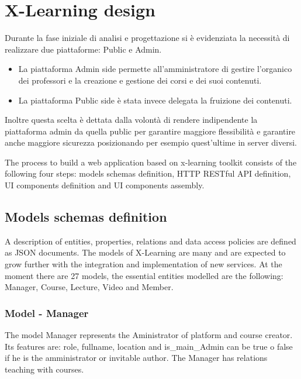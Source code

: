 \section{X-Learning design}
\label{sec:x-learning_design}

Durante la fase iniziale di analisi e progettazione si è evidenziata la necessità di realizzare due piattaforme: Public e Admin. 
\begin{itemize}
\item La piattaforma Admin side permette all'amministratore di gestire l'organico dei professori e la creazione e gestione dei corsi e dei suoi contenuti.
\item La piattaforma Public side è stata invece delegata la fruizione dei contenuti.
\end{itemize}

Inoltre questa scelta è dettata dalla volontà di rendere indipendente la piattaforma admin da quella public per garantire maggiore flessibilità e garantire anche maggiore sicurezza posizionando per esempio quest'ultime in server diversi.


The process to build a web application based on x-learning toolkit consists of the following four steps: models schemas definition, HTTP RESTful API definition, UI components definition and UI components  assembly.


\subsection {Models schemas definition}
\label{subsec:models_schemas_definitio}


A description of entities, properties, relations and data access policies are defined as JSON documents.
The models of X-Learning are many and are expected to grow further with the integration and implementation of new services. At the moment there are 27 models, the essential entities modelled are the following: Manager, Course, Lecture, Video and Member.


\subsubsection{ Model - Manager}

The model Manager represents the Aministrator of platform and course creator. Its features are: role, fullname, location and is\_main\_Admin can be true o false if he is the amministrator or invitable author. The Manager has relations teaching with courses.

